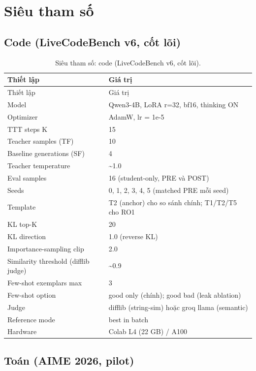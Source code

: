 \chapter{Siêu tham số}\label{appendix-a-hyperparameters}

\section{Code (LiveCodeBench v6, cốt lõi)}\label{a.1-code-livecodebench-v6-core}

\begin{longtable}{ll}
\caption{Siêu tham số: code (LiveCodeBench v6, cốt lõi).}\\
\toprule
Thiết lập & Giá trị \\
\midrule
\endfirsthead
\toprule
Thiết lập & Giá trị \\
\midrule
\endhead
\bottomrule
\endfoot
Model & Qwen3-4B, LoRA r=32, bf16, thinking ON \\
Optimizer & AdamW, lr = 1e-5 \\
TTT steps K & 15 \\
Teacher samples (TF) & 10 \\
Baseline generations (SF) & 4 \\
Teacher temperature & \textasciitilde1.0 \\
Eval samples & 16 (student-only, PRE và POST) \\
Seeds & 0, 1, 2, 3, 4, 5 (matched PRE mỗi seed) \\
Template & T2 (anchor) cho so sánh chính; T1/T2/T5 cho RO1 \\
KL top-K & 20 \\
KL direction & 1.0 (reverse KL) \\
Importance-sampling clip & 2.0 \\
Similarity threshold (difflib judge) & \textasciitilde0.9 \\
Few-shot exemplars max & 3 \\
Few-shot option & good only (chính); good bad (leak ablation) \\
Judge & difflib (string-sim) hoặc groq llama (semantic) \\
Reference mode & best in batch \\
Hardware & Colab L4 (22 GB) / A100 \\
\end{longtable}

\section{Toán (AIME 2026, pilot)}\label{a.2-math-aime-2026-pilot}

